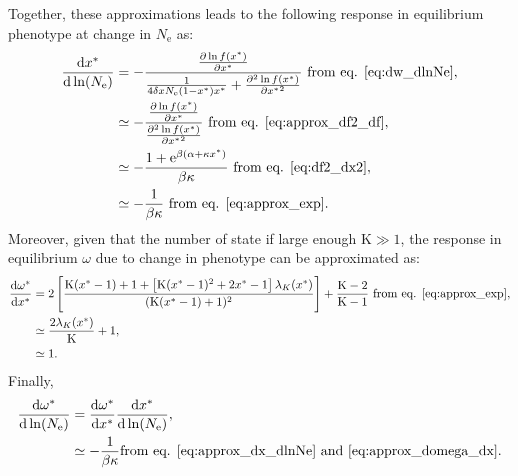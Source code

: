\documentclass{article}
\newcommand{\der}{\mathrm{d}}
\newcommand{\e}{\mathrm{e}}
\newcommand{\Ne}{N_{\mathrm{e}}}
\newcommand{\dnds}{\omega}
\newcommand{\Nstate}{\text{K}}
\newcommand{\x}{x}
\newcommand{\eq}{^{*}}
\newcommand{\dx}{\delta \x}
\begin{document}
Together, these approximations leads to the following response in equilibrium phenotype at change in $\Ne$ as:
\begin{align}
\frac{ \der \x\eq}{\der \ln (\Ne)} & = - \frac{\frac{ \partial \ln f(\x\eq) }{\partial {\x\eq}}}{\frac{1}{4 \dx \Ne  (1 - \x\eq) \x\eq} + \frac{ \partial^2 \ln f(\x\eq) }{\partial {\x\eq}^2}}\text{ from eq. \ref{eq:dw_dlnNe}}, \\
& \simeq - \frac{\frac{ \partial \ln f(\x\eq) }{\partial {\x\eq}}}{\frac{ \partial^2 \ln f(\x\eq) }{\partial {\x\eq}^2}}\text{ from eq. \ref{eq:approx_df2_df}}, \\
& \simeq - \frac{1 + \e^{\beta(\alpha + \kappa \x\eq)}}{\beta \kappa}\text{ from eq. \ref{eq:df2_dx2}}, \\
& \simeq - \frac{1}{\beta \kappa}\text{ from eq. \ref{eq:approx_exp}}. \label{eq:approx_dx_dlnNe}
\end{align}
Moreover, given that the number of state if large enough $\Nstate \gg 1$, the response in equilibrium $\dnds$ due to change in phenotype can be approximated as:
\begin{align}
\frac{ \der \dnds\eq}{\der \x\eq}  & = 2 \left[ \frac{\Nstate (\x\eq- 1) + 1+\left[\Nstate (\x\eq-1)^2+2 \x\eq-1\right] \lambda_{K}(\x\eq) }{(\Nstate (\x\eq-1)+1)^2}\right] + \frac{\Nstate - 2}{\Nstate - 1}\text{ from eq. \ref{eq:approx_exp}}, \\
& \simeq \frac{2 \lambda_{K}(\x\eq)}{\Nstate} + 1, \\
& \simeq 1. \label{eq:approx_domega_dx}
\end{align}
Finally,
\begin{align}
\frac{ \der \dnds\eq}{\der \ln (\Ne)}  & = \frac{ \der \dnds\eq}{\der \x\eq}  \frac{ \der \x\eq}{\der \ln (\Ne)}, \\
  & \simeq - \frac{1}{\beta \kappa} \text{from eq. \ref{eq:approx_dx_dlnNe} and \ref{eq:approx_domega_dx}}.
\end{align}
\end{document}
